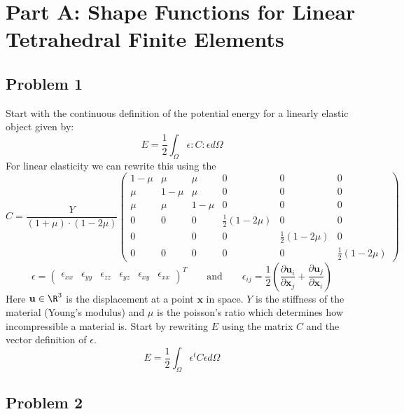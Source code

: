 \documentclass[11pt]{article}
\begin{document}
\section*{Part A: Shape Functions for Linear Tetrahedral Finite Elements}

\subsection*{Problem 1}
Start with the continuous definition of the potential energy for a linearly elastic object given by:
\[
    E=\frac{1} {2}\int_\Omega \epsilon\colon C \colon\epsilon d\Omega    
\]
For linear elasticity we can rewrite this using the
\[
    C=\frac{Y}{(1+\mu)\cdot(1-2\mu)}
    \begin{pmatrix} 
        1-\mu & \mu & \mu & 0 &0 &0 \\
        \mu & 1-\mu & \mu & 0 &0 &0 \\
        \mu & \mu & 1-\mu & 0 & 0 &0 \\
        0 & 0 & 0 & \frac{1}{2}(1-2\mu) &0 &0 \\
        0 & & 0 & 0 &\frac{1} {2}(1-2\mu) &0 \\
        0 & 0 & 0 & 0 &0 &\frac{1}{2}(1-2\mu) 
    \end{pmatrix}    
\]
\[
    \epsilon= 
    \begin{pmatrix}
        \epsilon_{xx} & \epsilon_{yy} & \epsilon_{zz} &\epsilon_{yz} & \epsilon_{xy} & \epsilon_{xx}
    \end{pmatrix}^T
    \quad \quad \text{and} \quad \quad
    \epsilon_{ij} =
    \frac{1}{2}\left(\frac{\partial \mathbf{u}_i}{\partial\mathbf{x}_j}+\frac{\partial \mathbf{u}_j}{\partial \mathbf{x}_i}\right)
\]
Here $\mathbf{u} \in \R^3$ is the displacement at a point $\mathbf{x}$ in space. $Y$ is the stiffness of the material (Young's modulus) and $\mu$ is the poisson's ratio which determines how incompressible a material is. Start by rewriting $E$ using the matrix $C$ and the vector definition of $\epsilon$.
\[
    E = \frac{1}{2} \int_{\Omega} \epsilon^t C \epsilon d\Omega    
\]


\subsection*{Problem 2}
\end{document}
